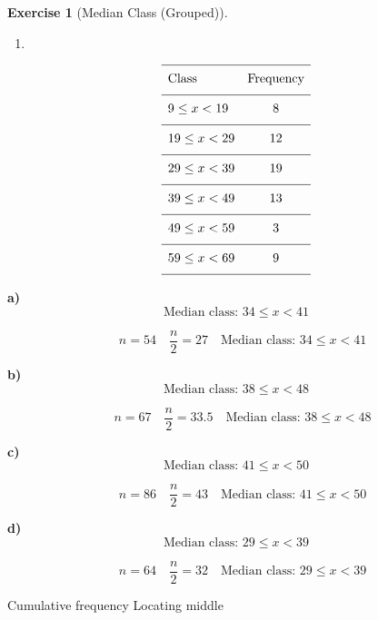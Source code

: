 \documentclass[
  letterpaper,
  DIV=11,
  numbers=noendperiod]{scrreprt}
\providecommand{\tightlist}{%
  \setlength{\itemsep}{0pt}\setlength{\parskip}{0pt}}
\theoremstyle{definition}
\newtheorem{exercise}{Exercise}[chapter]
\theoremstyle{remark}
\begin{document}
\begin{exercise}[Median Class
(Grouped)]
\begin{enumerate}
\def\labelenumi{\alph{enumi})}
\setcounter{enumi}{3}
\tightlist
\item
\end{enumerate}

\[{\renewcommand{\arraystretch}{1.6}\begin{array}{lc}
\hline \text{Class} & \text{Frequency} \\[4pt]
\hline 9 \leq x < 19  & 8 \\[4pt]
\hline 19 \leq x < 29  & 12 \\[4pt]
\hline 29 \leq x < 39  & 19 \\[4pt]
\hline 39 \leq x < 49  & 13 \\[4pt]
\hline 49 \leq x < 59  & 3 \\[4pt]
\hline 59 \leq x < 69  & 9 \\[4pt]
\hline \end{array}}\]

\begin{tcolorbox}[enhanced jigsaw, opacitybacktitle=0.6, coltitle=black, arc=.35mm, colframe=quarto-callout-tip-color-frame, colback=white, bottomrule=.15mm, left=2mm, colbacktitle=quarto-callout-tip-color!10!white, titlerule=0mm, opacityback=0, title=\textcolor{quarto-callout-tip-color}{\faLightbulb}\hspace{0.5em}{🔍 View Solution}, leftrule=.75mm, breakable, rightrule=.15mm, bottomtitle=1mm, toptitle=1mm, toprule=.15mm]

\textbf{a)} \[\text{Median class: }34 \leq x < 41\]

\[\quad n=54\quad \frac{n}{2}=27\quad \text{Median class: }34 \leq x < 41\]

\textbf{b)} \[\text{Median class: }38 \leq x < 48\]

\[\quad n=67\quad \frac{n}{2}=33.5\quad \text{Median class: }38 \leq x < 48\]

\textbf{c)} \[\text{Median class: }41 \leq x < 50\]

\[\quad n=86\quad \frac{n}{2}=43\quad \text{Median class: }41 \leq x < 50\]

\textbf{d)} \[\text{Median class: }29 \leq x < 39\]

\[\quad n=64\quad \frac{n}{2}=32\quad \text{Median class: }29 \leq x < 39\]

\end{tcolorbox}

{Cumulative frequency} {Locating middle}

\end{exercise}
\end{document}
